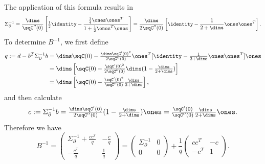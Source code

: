 The application of this formula results in
\begin{equation}\label{eq: sigma_partial inverse}
	\Sigma_\partial^{-1}
	= \frac{\dims}{\sqC''(0)}\left[
		\tfrac12\identity - \frac{\tfrac14\ones\ones^T}{1+\tfrac12\ones^T\ones}
	\right]
	= \frac{\dims}{2\sqC''(0)}\left[
		\identity - \frac{1}{2+\dims}\ones\ones^T
	\right].
\end{equation}
To determine \(B^{-1}\), we first define
\begin{align*}
	q := d - b^T \Sigma_\partial^{-1}b
	&= \dims\sqC(0) - \tfrac{\dims\sqC'(0)^2}{2\sqC''(0)}\ones^T
	[\identity-\tfrac1{2+\dims}\ones\ones^T]\ones\\
	&= \dims\left[
		\sqC(0) - \tfrac{\sqC'(0)^2}{2\sqC''(0)}
		\dims( 1-\tfrac{\dims}{2+\dims} )
	\right]\\
	&= \dims\left[
		\sqC(0) - \tfrac{\sqC'(0)^2}{\sqC''(0)}
		\tfrac{\dims}{2+\dims}
	\right],
\end{align*}
and then calculate
\begin{equation}\label{eq: definition of c=sigma_partial^{-1} b}
	c:=\Sigma_\partial^{-1}b
	= \tfrac{\dims\sqC'(0)}{2\sqC''(0)}( 1 - \tfrac{\dims}{2+\dims} )\ones
	= \tfrac{\sqC'(0)}{\sqC''(0)}\tfrac{\dims}{2+\dims}\ones.
\end{equation}
Therefore we have
\begin{equation}\label{eq: inv B split}
	B^{-1} = \begin{pmatrix}
		\Sigma_\partial^{-1}	+ \frac{cc^T}{q} & - \frac{c}{q}\\
		-\frac{c^T}{q} & \frac1q
	\end{pmatrix}
	= \begin{pmatrix}
		\Sigma_\partial^{-1} & 0 \\
		0 & 0
	\end{pmatrix}
	+ \frac1q \begin{pmatrix}
		cc^T & -c\\
		-c^T & 1
	\end{pmatrix}.
\end{equation}

